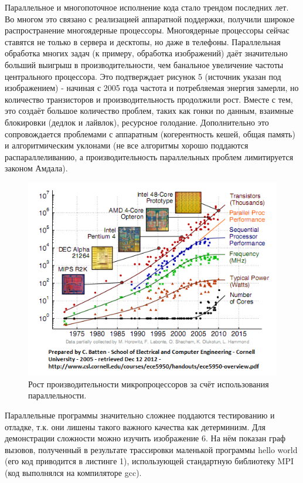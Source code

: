 \documentclass[a4paper, 12pt]{article} %
\begin{document}
Параллельное и многопоточное исполнение кода стало трендом последних лет. Во многом это связано с реализацией аппаратной поддержки, получили широкое распространение многоядерные процессоры. Многоядерные процессоры сейчас ставятся не только в сервера и десктопы, но даже в телефоны. Параллельная обработка многих задач (к примеру, обработка изображений) даёт значительно больший выигрыш в производительности, чем банальное увеличение частоты центрального процессора. Это подтверждает рисунок 5 (источник указан под изображением) - начиная с 2005 года частота и потребляемая энергия замерли, но количество транзисторов и производительность продолжили рост. Вместе с тем, это создаёт большое количество проблем, таких как гонки по данным, взаимные блокировки (дедлок и лайвлок), ресурсное голодание. Дополнительно это сопровождается проблемами с аппаратным (когерентность кешей, общая память) и алгоритмическим уклонами (не все алгоритмы хорошо поддаются распараллеливанию, а производительность параллельных проблем лимитируется законом Амдала).

\begin{figure}[h!]
\centering
\includegraphics[scale=1]{res/pic005}
\caption{Рост производительности микропроцессоров за счёт использования параллельности.}
\end{figure}

Параллельные программы значительно сложнее поддаются тестированию и отладке, т.к. они лишены такого важного качества как детерминизм. Для демонстрации сложности можно изучить изображение 6. На нём показан граф вызовов, полученный в результате трассировки маленькой программы hello world (его код приводится в листинге 1), использующей стандартную библиотеку MPI (код выполнялся на компиляторе gcc).
\end{document}
